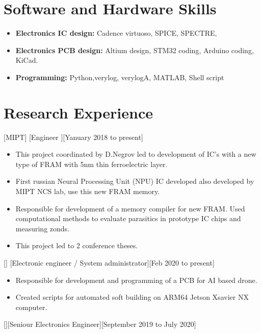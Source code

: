 \documentclass{article}
\begin{document}
\section{Software and Hardware Skills}
\begin{itemize}
\item \textbf{Electronics IC design:} Cadence virtuoso, SPICE, SPECTRE,
\item \textbf{Electronics PCB design:} Altium design, STM32 coding, Arduino coding, KiCad.
\item \textbf{Programming:} Python,verylog, verylogA, MATLAB, Shell script
\end{itemize}

\section{Research Experience}

[MIPT]
[Engineer ][Yanuary 2018 to present]

\begin{itemize}
\item This project coordinated by D.Negrov led to development of IC's with a new type of FRAM with 5nm thin ferroelectric layer.
\item First russian Neural Processing Unit (NPU) IC developed also developed by MIPT NCS lab, use this new FRAM memory.
\item Responsible for development of a memory compiler for new FRAM. Used computational methods to evaluate parasitics in prototype IC chips and measuring zonds.
\item This project led to 2 conference theses.
\end{itemize}


[]
[Electronic engineer / System administrator][Feb 2020 to present]

\begin{itemize}
\item Responsible for development and programming of a PCB for AI based drone.
\item Created scripts for automated soft building on ARM64 Jetson Xsavier NX computer.
\end{itemize}

[][Seniour Electronics Engineer][September 2019 to July 2020]
\end{document}
